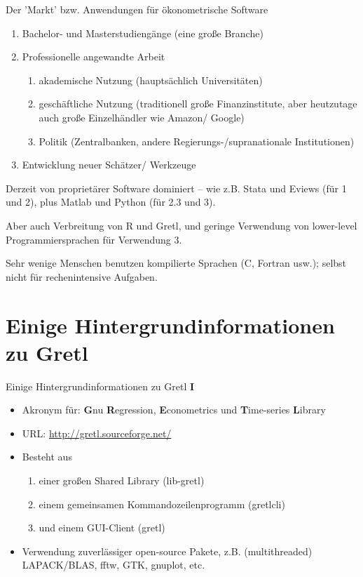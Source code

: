 \documentclass{beamer}[11pt]
\begin{document}
\begin{frame}{Der 'Markt' bzw. Anwendungen für ökonometrische Software}
	\begin{enumerate}
		\item Bachelor- und Masterstudiengänge (eine große Branche)
		\item Professionelle angewandte Arbeit
		      \begin{enumerate}
			      \item akademische Nutzung (hauptsächlich Universitäten)
			      \item geschäftliche Nutzung (traditionell große Finanzinstitute, aber heutzutage auch große Einzelhändler wie Amazon/ Google)
			      \item Politik (Zentralbanken, andere Regierungs-/supranationale Institutionen)
		      \end{enumerate}
		\item Entwicklung neuer Schätzer/ Werkzeuge
	\end{enumerate}

	Derzeit von proprietärer Software dominiert -- wie z.B. Stata und Eviews (für 1 und 2), plus Matlab und Python (für 2.3 und 3).
	\medskip

	Aber auch Verbreitung von R und Gretl, und geringe Verwendung von lower-level Programmiersprachen für Verwendung 3.
	\medskip

	Sehr wenige Menschen benutzen kompilierte Sprachen (C, Fortran usw.); selbst nicht für rechenintensive Aufgaben.
\end{frame}


\section{Einige Hintergrundinformationen zu Gretl}

\begin{frame}{Einige Hintergrundinformationen zu Gretl \textbf{I}}
	\begin{itemize}
		\item Akronym für:
		      \textbf{G}nu \textbf{R}egression, \textbf{E}conometrics und \textbf{T}ime-series \textbf{L}ibrary
		\item URL: \url{http://gretl.sourceforge.net/}
		\item Besteht aus
		      \begin{enumerate}
			      \item einer großen Shared Library (lib-gretl)
			      \item einem gemeinsamen Kommandozeilenprogramm (gretlcli)
			      \item und einem GUI-Client (gretl)
		      \end{enumerate}
		\item Verwendung zuverlässiger open-source Pakete, z.B. (multithreaded) LAPACK/BLAS, fftw, GTK, gnuplot, etc.
	\end{itemize}
\end{frame}
\end{document}
